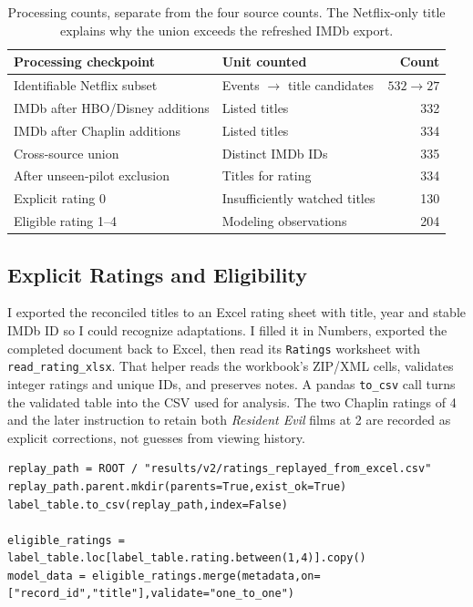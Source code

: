 \documentclass[11pt,letterpaper]{article}
\begin{document}
\begin{table}[htbp]\centering\small
\begin{tabular}{@{}p{.42\linewidth}p{.39\linewidth}r@{}}\toprule
Processing checkpoint &Unit counted &Count\\\midrule
Identifiable Netflix subset&Events $\rightarrow$ title candidates&$532\rightarrow27$\\
IMDb after HBO/Disney additions&Listed titles&332\\
IMDb after Chaplin additions&Listed titles&334\\
Cross-source union&Distinct IMDb IDs&335\\
After unseen-pilot exclusion&Titles for rating&334\\
Explicit rating 0&Insufficiently watched titles&130\\
Eligible rating 1--4&Modeling observations&204\\
\bottomrule\end{tabular}
\caption{Processing counts, separate from the four source counts. The Netflix-only title explains why the union exceeds the refreshed IMDb export.}\label{tab:processing}\end{table}


\FloatBarrier
\subsection{Explicit Ratings and Eligibility}
I exported the reconciled titles to an Excel rating sheet with title, year and stable IMDb ID so I could recognize adaptations. I filled it in Numbers, exported the completed document back to Excel, then read its \texttt{Ratings} worksheet with \texttt{read\_rating\_xlsx}. That helper reads the workbook's ZIP/XML cells, validates integer ratings and unique IDs, and preserves notes. A pandas \texttt{to\_csv} call turns the validated table into the CSV used for analysis. The two Chaplin ratings of 4 and the later instruction to retain both \emph{Resident Evil} films at 2 are recorded as explicit corrections, not guesses from viewing history.

\begin{lstlisting}[caption={The validated rating table is saved to CSV; zero-rated titles are excluded before a one-to-one metadata join.}]
replay_path = ROOT / "results/v2/ratings_replayed_from_excel.csv"
replay_path.parent.mkdir(parents=True,exist_ok=True)
label_table.to_csv(replay_path,index=False)

eligible_ratings = label_table.loc[label_table.rating.between(1,4)].copy()
model_data = eligible_ratings.merge(metadata,on=["record_id","title"],validate="one_to_one")
\end{lstlisting}
\end{document}
